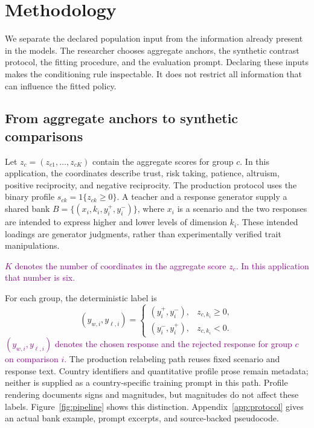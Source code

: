 \section{Methodology}\label{sec:methodology}
We separate the declared population input from the information already present in the models. The researcher chooses aggregate anchors, the synthetic contrast protocol, the fitting procedure, and the evaluation prompt. Declaring these inputs makes the conditioning rule inspectable. It does not restrict all information that can influence the fitted policy.

\subsection{From aggregate anchors to synthetic comparisons}
Let $z_c=(z_{c1},\ldots,z_{cK})$ contain the aggregate scores for group $c$. In this application, the coordinates describe trust, risk taking, patience, altruism, positive reciprocity, and negative reciprocity. The production protocol uses the binary profile $s_{ck}=1\{z_{ck}\geq0\}$. A teacher and a response generator supply a shared bank $B=\{(x_i,k_i,y_i^+,y_i^-)\}$, where $x_i$ is a scenario and the two responses are intended to express higher and lower levels of dimension $k_i$. These intended loadings are generator judgments, rather than experimentally verified trait manipulations.

\textcolor{purple}{$K$ denotes the number of coordinates in the aggregate score $z_c$. In this application that number is six.}

For each group, the deterministic label is
\begin{equation}
(y_{w,i},y_{\ell,i})=\begin{cases}(y_i^+,y_i^-),&z_{c,k_i}\geq0,\\(y_i^-,y_i^+),&z_{c,k_i}<0.\end{cases}
\label{eq:sign_rule}
\end{equation}
\textcolor{purple}{$(y_{w,i},y_{\ell,i})$ denotes the chosen response and the rejected response for group $c$ on comparison $i$.}
The production relabeling path reuses fixed scenario and response text. Country identifiers and quantitative profile prose remain metadata; neither is supplied as a country-specific training prompt in this path. Profile rendering documents signs and magnitudes, but magnitudes do not affect these labels. Figure~\ref{fig:pipeline} shows this distinction. Appendix~\ref{app:protocol} gives an actual bank example, prompt excerpts, and source-backed pseudocode.

